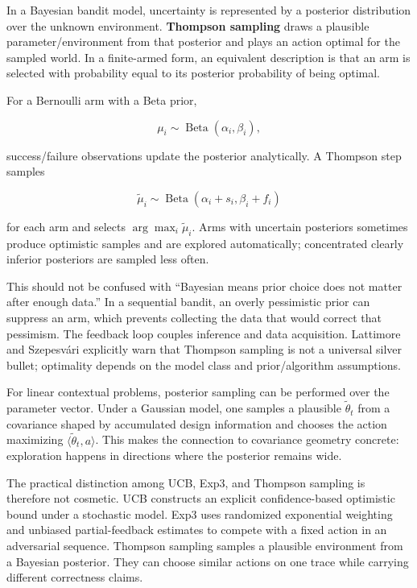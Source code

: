 In a Bayesian bandit model, uncertainty is represented by a posterior distribution over the unknown environment. \textbf{Thompson sampling} draws a plausible parameter/environment from that posterior and plays an action optimal for the sampled world. In a finite-armed form, an equivalent description is that an arm is selected with probability equal to its posterior probability of being optimal.

For a Bernoulli arm with a Beta prior,

\[
\mu_i\sim\operatorname{Beta}(\alpha_i,\beta_i),
\]

success/failure observations update the posterior analytically. A Thompson step samples

\[
\tilde\mu_i\sim
\operatorname{Beta}(\alpha_i+s_i,\beta_i+f_i)
\]

for each arm and selects \(\arg\max_i\tilde\mu_i\). Arms with uncertain posteriors sometimes produce optimistic samples and are explored automatically; concentrated clearly inferior posteriors are sampled less often.

This should not be confused with ``Bayesian means prior choice does not matter after enough data.'' In a sequential bandit, an overly pessimistic prior can suppress an arm, which prevents collecting the data that would correct that pessimism. The feedback loop couples inference and data acquisition. Lattimore and Szepesvári explicitly warn that Thompson sampling is not a universal silver bullet; optimality depends on the model class and prior/algorithm assumptions.

For linear contextual problems, posterior sampling can be performed over the parameter vector. Under a Gaussian model, one samples a plausible \(\tilde\theta_t\) from a covariance shaped by accumulated design information and chooses the action maximizing \(\langle \tilde\theta_t,a\rangle\). This makes the connection to covariance geometry concrete: exploration happens in directions where the posterior remains wide.

The practical distinction among UCB, Exp3, and Thompson sampling is therefore not cosmetic. UCB constructs an explicit confidence-based optimistic bound under a stochastic model. Exp3 uses randomized exponential weighting and unbiased partial-feedback estimates to compete with a fixed action in an adversarial sequence. Thompson sampling samples a plausible environment from a Bayesian posterior. They can choose similar actions on one trace while carrying different correctness claims.

